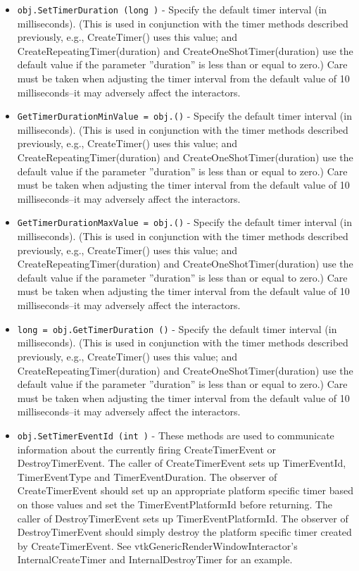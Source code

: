 \begin{itemize}
\item  \verb|obj.SetTimerDuration (long )| -  Specify the default timer interval (in milliseconds). (This is used in
 conjunction with the timer methods described previously, e.g.,
 CreateTimer() uses this value; and CreateRepeatingTimer(duration) and
 CreateOneShotTimer(duration) use the default value if the parameter
 ''duration'' is less than or equal to zero.) Care must be taken when
 adjusting the timer interval from the default value of 10
 milliseconds--it may adversely affect the interactors.

\item  \verb|GetTimerDurationMinValue = obj.()| -  Specify the default timer interval (in milliseconds). (This is used in
 conjunction with the timer methods described previously, e.g.,
 CreateTimer() uses this value; and CreateRepeatingTimer(duration) and
 CreateOneShotTimer(duration) use the default value if the parameter
 ''duration'' is less than or equal to zero.) Care must be taken when
 adjusting the timer interval from the default value of 10
 milliseconds--it may adversely affect the interactors.

\item  \verb|GetTimerDurationMaxValue = obj.()| -  Specify the default timer interval (in milliseconds). (This is used in
 conjunction with the timer methods described previously, e.g.,
 CreateTimer() uses this value; and CreateRepeatingTimer(duration) and
 CreateOneShotTimer(duration) use the default value if the parameter
 ''duration'' is less than or equal to zero.) Care must be taken when
 adjusting the timer interval from the default value of 10
 milliseconds--it may adversely affect the interactors.

\item  \verb|long = obj.GetTimerDuration ()| -  Specify the default timer interval (in milliseconds). (This is used in
 conjunction with the timer methods described previously, e.g.,
 CreateTimer() uses this value; and CreateRepeatingTimer(duration) and
 CreateOneShotTimer(duration) use the default value if the parameter
 ''duration'' is less than or equal to zero.) Care must be taken when
 adjusting the timer interval from the default value of 10
 milliseconds--it may adversely affect the interactors.

\item  \verb|obj.SetTimerEventId (int )| -  These methods are used to communicate information about the currently
 firing CreateTimerEvent or DestroyTimerEvent. The caller of
 CreateTimerEvent sets up TimerEventId, TimerEventType and
 TimerEventDuration. The observer of CreateTimerEvent should set up an
 appropriate platform specific timer based on those values and set the
 TimerEventPlatformId before returning. The caller of DestroyTimerEvent
 sets up TimerEventPlatformId. The observer of DestroyTimerEvent should
 simply destroy the platform specific timer created by CreateTimerEvent.
 See vtkGenericRenderWindowInteractor's InternalCreateTimer and
 InternalDestroyTimer for an example.


\end{itemize}
